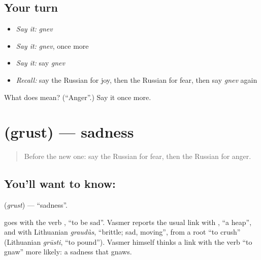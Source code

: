 \subsection*{Your turn}
\begin{itemize}
\raggedright
  \item \emph{Say it:} \emph{gnev}
  \item \emph{Say it:} \emph{gnev}, once more
  \item \emph{Say it:} say \emph{gnev}
  \item \emph{Recall:} say the Russian for joy, then the Russian for fear, then say \emph{gnev} again
\end{itemize}

\begin{tcolorbox}[breakable,colback=teal!4,colframe=teal!35!black,title={Before you move on}]
What does  mean? (\textquotedblleft{}Anger\textquotedblright{}.) Say it once more.
\end{tcolorbox}
\section[\texorpdfstring{\ru{грусть} (grust)}{грусть (grust)}]{ (grust) — sadness}

\label{lesson:RU-C34-sadness}



\begin{quote}
Before the new one: say the Russian for fear, then the Russian for anger.
\end{quote}

\subsection*{You'll want to know: }
\textbf{} (\emph{grust}) — \textquotedblleft{}sadness\textquotedblright{}.

\begin{cousinweb}
\textbf{} goes with the verb \emph{}, \textquotedblleft{}to be sad\textquotedblright{}. Vasmer reports the usual link with \emph{}, \textquotedblleft{}a heap\textquotedblright{}, and with Lithuanian \emph{graudùs}, \textquotedblleft{}brittle; sad, moving\textquotedblright{}, from a root \textquotedblleft{}to crush\textquotedblright{} (Lithuanian \emph{grūsti}, \textquotedblleft{}to pound\textquotedblright{}). Vasmer himself thinks a link with the verb \textquotedblleft{}to gnaw\textquotedblright{} more likely: a sadness that gnaws.
\end{cousinweb}

